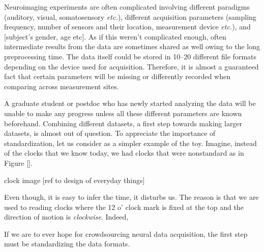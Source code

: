 Neuroimaging experiments are often complicated involving different paradigms (auditory, visual, somatosensory \emph{etc.}), different acquisition parameters (sampling frequency, number of sensors and their location, measurement device \emph{etc.}), and [subject's gender, age etc]. As if this weren't complicated enough, often intermediate results from the data are sometimes shared as well owing to the long preprocessing time. The data itself could be stored in 10--20 different file formats depending on the device used for acquisition. Therefore, it is almost a guaranteed fact that certain parameters will be missing or differently recorded when comparing across measurement sites.

A graduate student or postdoc who has newly started analyzing the data will be unable to make any progress unless all these different parameters are known beforehand. Combining different datasets, a first step towards making larger datasets, is almost out of question. To appreciate the importance of standardization, let us consider as a simpler example of the toy. Imagine, instead of the clocks that we know today, we had clocks that were nonstandard as in Figure [].

clock image [ref to design of everyday things]

Even though, it is easy to infer the time, it disturbs us. The reason is that we are used to reading clocks where the 12 o' clock mark is fixed at the top and the direction of motion is \emph{clockwise}. Indeed,

If we are to ever hope for crowdsourcing neural data acquisition, the first step must be standardizing the data formats.

